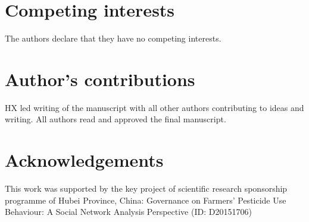 \documentclass{bmcart}
\begin{document}
\begin{backmatter}

\section*{Competing interests}
The authors declare that they have no competing interests.

\section*{Author's contributions}
HX led writing of the manuscript with all other authors contributing to ideas and writing. All authors read and approved the final manuscript.

\section*{Acknowledgements}
This work was supported by the key project of scientific research sponsorship programme of Hubei Province, China: Governance on Farmers' Pesticide Use Behaviour: A Social Network Analysis Perspective (ID: D20151706)





\end{backmatter}
\end{document}
